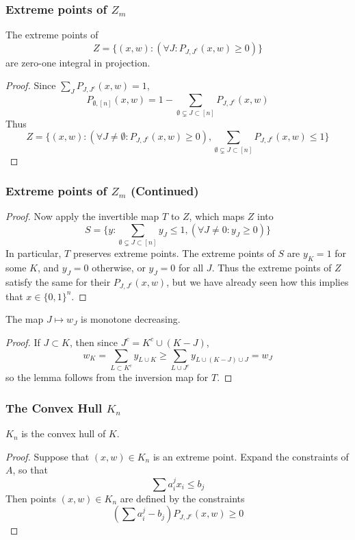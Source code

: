 \documentclass{beamer}
\begin{document}
\begin{frame}
    \frametitle{Extreme points of $Z_m$}

    \begin{lemma}
        The extreme points of
        \[ Z = \{ (x,w) : (\forall J: P_{J,J^c}(x,w) \geq 0) \} \]
        are zero-one integral in projection.
    \end{lemma}
    \begin{proof}
        Since $\sum_{J} P_{J,J^c}(x,w) = 1$,
        \[ P_{\emptyset, [n]}(x,w) = 1 - \sum_{\emptyset \subsetneq J \subset [n]} P_{J,J^c}(x,w) \]
        Thus
        \[ Z = \{ (x,w) : (\forall J \neq \emptyset: P_{J,J^c}(x,w) \geq 0), \sum_{\emptyset \subsetneq J \subset [n]} P_{J,J^c}(x,w) \leq 1 \} \]
    \end{proof}
\end{frame}

\begin{frame}
    \frametitle{Extreme points of $Z_m$ (Continued)}

    \begin{proof}
        Now apply the invertible map $T$ to $Z$, which maps $Z$ into
        \[ S = \{ y : \sum_{\emptyset \subsetneq J \subset [n]} y_J \leq 1, (\forall J \neq 0: y_J \geq 0) \} \]
        In particular, $T$ preserves extreme points. The extreme points of $S$ are $y_K = 1$ for some $K$, and $y_J = 0$ otherwise, or $y_J = 0$ for all $J$. Thus the extreme points of $Z$ satisfy the same for their $P_{J,J^c}(x,w)$, but we have already seen how this implies that $x \in \{ 0, 1 \}^n$.
    \end{proof}
\end{frame}

\begin{frame}
    \begin{lemma}
        The map $J \mapsto w_J$ is monotone decreasing.
    \end{lemma}
    \begin{proof}
        If $J \subset K$, then since $J^c = K^c \cup (K - J)$,
        \[ w_K = \sum_{L \subset K^c} y_{L \cup K} \geq \sum_{L \cup J^c} y_{L \cup (K - J) \cup J} = w_J \]
        so the lemma follows from the inversion map for $T$.
    \end{proof}
\end{frame}

\begin{frame}
    \frametitle{The Convex Hull $K_n$}

    \begin{theorem}
        $K_n$ is the convex hull of $K$.
    \end{theorem}
    \begin{proof}
        Suppose that $(x,w) \in K_n$ is an extreme point. Expand the constraints of $A$, so that
        \[ \sum a_i^j x_i \leq b_j \]
        Then points $(x,w) \in K_n$ are defined by the constraints
        \[ \left( \sum a_i^j - b_j \right) P_{J,J^c}(x,w) \geq 0 \]
    \end{proof}
\end{frame}
\end{document}
